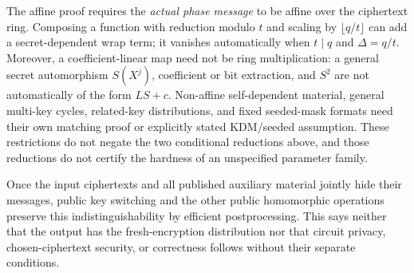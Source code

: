 The affine proof requires the \emph{actual phase message} to be affine over the ciphertext ring. Composing a function with reduction modulo $t$ and scaling by $\lfloor q/t\rfloor$ can add a secret-dependent wrap term; it vanishes automatically when $t\mid q$ and $\Delta=q/t$. Moreover, a coefficient-linear map need not be ring multiplication: a general secret automorphism $S(X^j)$, coefficient or bit extraction, and $S^2$ are not automatically of the form $LS+c$. Non-affine self-dependent material, general multi-key cycles, related-key distributions, and fixed seeded-mask formats need their own matching proof or explicitly stated KDM/seeded assumption. These restrictions do not negate the two conditional reductions above, and those reductions do not certify the hardness of an unspecified parameter family.

Once the input ciphertexts and all published auxiliary material jointly hide their messages, public key switching and the other public homomorphic operations preserve this indistinguishability by efficient postprocessing. This says neither that the output has the fresh-encryption distribution nor that circuit privacy, chosen-ciphertext security, or correctness follows without their separate conditions.

